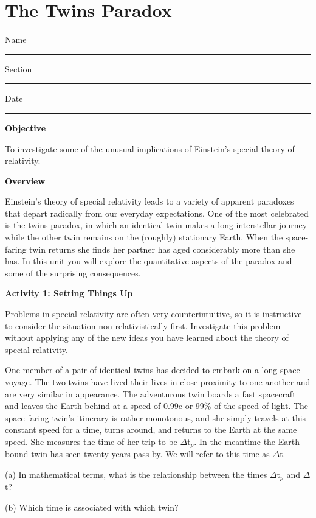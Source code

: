 
\section{The Twins Paradox}

Name \rule{2.0in}{0.1pt}\hfill{}Section \rule{1.0in}{0.1pt}\hfill{}Date
\rule{1.0in}{0.1pt}

\textbf{Objective}

To investigate some of the unusual implications of Einstein's special
theory of relativity.

\textbf{Overview}

Einstein's theory of special relativity leads to a variety of apparent
paradoxes that depart radically from our everyday expectations. One
of the most celebrated is the twins paradox, in which an identical
twin makes a long interstellar journey while the other twin remains
on the (roughly) stationary Earth. When the space-faring twin returns
she finds her partner has aged considerably more than she has. In
this unit you will explore the quantitative aspects of the paradox
and some of the surprising consequences.

\textbf{Activity 1: Setting Things Up}

Problems in special relativity are often very counterintuitive, so
it is instructive to consider the situation non-relativistically first.
Investigate this problem without applying any of the new ideas you
have learned about the theory of special relativity.

One member of a pair of identical twins has decided to embark on a
long space voyage. The two twins have lived their lives in close proximity
to one another and are very similar in appearance. The adventurous
twin boards a fast spacecraft and leaves the Earth behind at a speed
of 0.99c or 99\% of the speed of light. The space-faring twin's itinerary
is rather monotonous, and she simply travels at this constant speed
for a time, turns around, and returns to the Earth at the same speed.
She measures the time of her trip to be \( \Delta  \)t\( _{p} \).
In the meantime the Earth-bound twin has seen twenty years pass by.
We will refer to this time as \( \Delta  \)t.

(a) In mathematical terms, what is the relationship between the times
\( \Delta  \)t\( _{p} \) and \( \Delta  \)t?
\vspace{15mm}

(b) Which time is associated with which twin?
\vspace{15mm}

